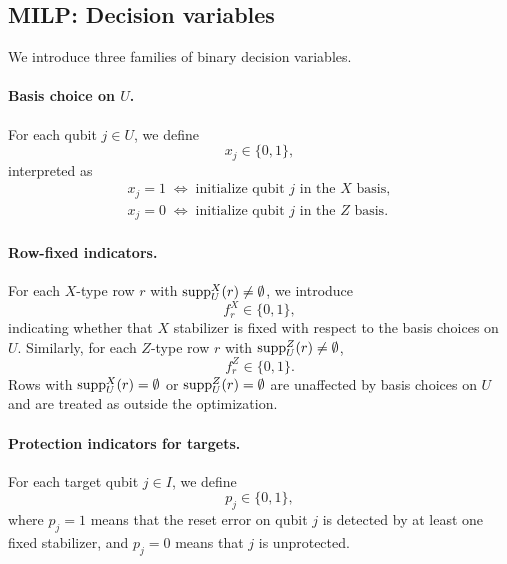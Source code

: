 \subsection{MILP: Decision variables}

We introduce three families of binary decision variables.

\paragraph{Basis choice on $U$.}
For each qubit $j \in U$, we define
\begin{equation}
  x_j \in \{0,1\},
\end{equation}
interpreted as
\begin{equation}
  \begin{aligned}
    x_j = 1 \;\Longleftrightarrow\; \text{initialize qubit $j$ in the $X$ basis}, \\
    x_j = 0 \;\Longleftrightarrow\; \text{initialize qubit $j$ in the $Z$ basis}.
  \end{aligned}
\end{equation}

\paragraph{Row-fixed indicators.}
For each $X$-type row $r$ with $\mathrm{supp}^X_U(r) \neq \emptyset$, we introduce
\begin{equation}
  f_r^X \in \{0,1\},
\end{equation}
indicating whether that $X$ stabilizer is fixed with respect to the basis choices on $U$. Similarly, for each $Z$-type row $r$ with $\mathrm{supp}^Z_U(r) \neq \emptyset$,
\begin{equation}
  f_r^Z \in \{0,1\}.
\end{equation}
Rows with $\mathrm{supp}^X_U(r) = \emptyset$ or $\mathrm{supp}^Z_U(r) = \emptyset$ are unaffected by basis choices on $U$ and are treated as outside the optimization.

\paragraph{Protection indicators for targets.}
For each target qubit $j \in I$, we define
\begin{equation}
  p_j \in \{0,1\},
\end{equation}
where $p_j = 1$ means that the reset error on qubit $j$ is detected by at least one fixed stabilizer, and $p_j = 0$ means that $j$ is unprotected.

